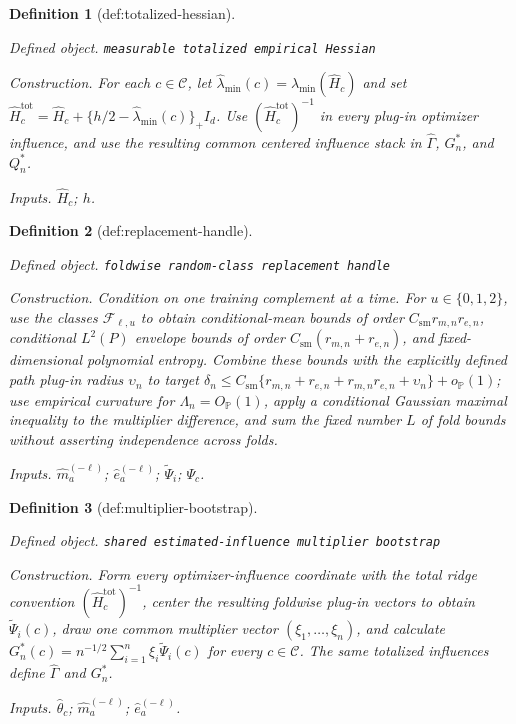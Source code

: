 \documentclass{article}
\newtheorem{definition}{Definition}
\begin{document}
\begin{definition}[def:totalized-hessian]\label{def:totalized-hessian}
\par\smallskip\noindent\emph{Defined object.} \texttt{measurable totalized empirical Hessian}
\par\smallskip\noindent\emph{Construction.} For each \(c\in\mathcal C\), let \(\widehat\lambda_{\min}(c)=\lambda_{\min}(\widehat H_c)\) and set \(\widehat H_c^{\mathrm{tot}}=\widehat H_c+\{h/2-\widehat\lambda_{\min}(c)\}_+I_d\). Use \((\widehat H_c^{\mathrm{tot}})^{-1}\) in every plug-in optimizer influence, and use the resulting common centered influence stack in \(\widehat\Gamma\), \(G_n^*\), and \(Q_n^*\).
\par\smallskip\noindent\emph{Inputs.} \(\widehat H_c\); \(h\).
\end{definition}

\begin{definition}[def:replacement-handle]\label{def:replacement-handle}
\par\smallskip\noindent\emph{Defined object.} \texttt{foldwise random-\allowbreak{}class replacement handle}
\par\smallskip\noindent\emph{Construction.} Condition on one training complement at a time. For \(u\in\{0,1,2\}\), use the classes \(\mathcal F_{\ell,u}\) to obtain conditional-mean bounds of order \(C_{\mathrm{sm}}r_{m,n}r_{e,n}\), conditional \(L^2(P)\) envelope bounds of order \(C_{\mathrm{sm}}(r_{m,n}+r_{e,n})\), and fixed-dimensional polynomial entropy. Combine these bounds with the explicitly defined path plug-in radius \(\upsilon_n\) to target \(\delta_n\le C_{\mathrm{sm}}\{r_{m,n}+r_{e,n}+r_{m,n}r_{e,n}+\upsilon_n\}+o_{\mathbb P}(1)\); use empirical curvature for \(\Lambda_n=O_{\mathbb P}(1)\), apply a conditional Gaussian maximal inequality to the multiplier difference, and sum the fixed number \(L\) of fold bounds without asserting independence across folds.
\par\smallskip\noindent\emph{Inputs.} \(\widehat m_a^{(-\ell)}\); \(\widehat e_a^{(-\ell)}\); \(\widetilde\Psi_i\); \(\Psi_c\).
\end{definition}

\begin{definition}[def:multiplier-bootstrap]\label{def:multiplier-bootstrap}
\par\smallskip\noindent\emph{Defined object.} \texttt{shared estimated-\allowbreak{}influence multiplier bootstrap}
\par\smallskip\noindent\emph{Construction.} Form every optimizer-influence coordinate with the total ridge convention \((\widehat H_c^{\mathrm{tot}})^{-1}\), center the resulting foldwise plug-in vectors to obtain \(\widetilde\Psi_i(c)\), draw one common multiplier vector \((\xi_1,\ldots,\xi_n)\), and calculate \(G_n^*(c)=n^{-1/2}\sum_{i=1}^n\xi_i\widetilde\Psi_i(c)\) for every \(c\in\mathcal C\). The same totalized influences define \(\widehat\Gamma\) and \(G_n^*\).
\par\smallskip\noindent\emph{Inputs.} \(\widehat\theta_c\); \(\widehat m_a^{(-\ell)}\); \(\widehat e_a^{(-\ell)}\).
\end{definition}
\end{document}
